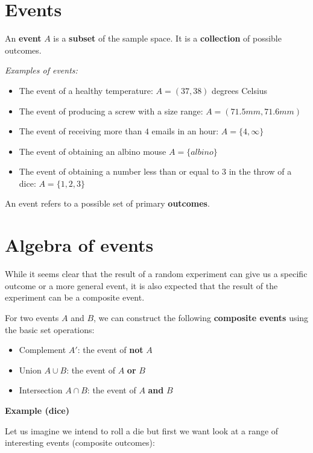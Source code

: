 \documentclass[
]{book}
\providecommand{\tightlist}{%
  \setlength{\itemsep}{0pt}\setlength{\parskip}{0pt}}
\begin{document}
\hypertarget{events}{%
\section{Events}\label{events}}

An \textbf{event} \(A\) is a \textbf{subset} of the sample space. It is a \textbf{collection} of possible outcomes.

\emph{Examples of events:}

\begin{itemize}
\tightlist
\item
  The event of a healthy temperature: \(A=(37,38)\) degrees Celsius
\item
  The event of producing a screw with a size range: \(A = (71.5mm, 71.6mm)\)
\item
  The event of receiving more than \(4\) emails in an hour: \(A= \{ 4, \infty \}\)
\item
  The event of obtaining an albino mouse \(A=\{albino\}\)
\item
  The event of obtaining a number less than or equal to 3 in the throw of a dice: \(A= \{ 1,2,3\}\)
\end{itemize}

An event refers to a possible set of primary \textbf{outcomes}.

\hypertarget{algebra-of-events}{%
\section{Algebra of events}\label{algebra-of-events}}

While it seems clear that the result of a random experiment can give us a specific outcome or a more general event, it is also expected that the result of the experiment can be a composite event.

For two events \(A\) and \(B\), we can construct the following \textbf{composite events} using the basic set operations:

\begin{itemize}
\tightlist
\item
  Complement \(A'\): the event of \textbf{not} \(A\)
\item
  Union \(A \cup B\): the event of \(A\) \textbf{or} \(B\)
\item
  Intersection \(A \cap B\): the event of \(A\) \textbf{and} \(B\)
\end{itemize}

\textbf{Example (dice)}

Let us imagine we intend to roll a die but first we want look at a range of interesting events (composite outcomes):
\end{document}
